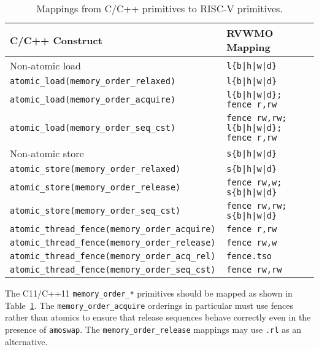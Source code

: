 \begin{table}[h!]
  \begin{tabular}{|l|l|}
    \hline
    C/C++ Construct                            & RVWMO Mapping \\
    \hline
    \hline
    Non-atomic load                            & \tt l\{b|h|w|d\}               \\
    \hline
    \tt atomic\_load(memory\_order\_relaxed)   & \tt l\{b|h|w|d\}               \\
    \hline
    \tt atomic\_load(memory\_order\_acquire)   & \tt l\{b|h|w|d\}; fence r,rw    \\
    \hline
    \tt atomic\_load(memory\_order\_seq\_cst)  & \tt fence rw,rw; l\{b|h|w|d\}; fence r,rw       \\
    \hline
    \hline
    Non-atomic store                           & \tt s\{b|h|w|d\}               \\
    \hline
    \tt atomic\_store(memory\_order\_relaxed)  & \tt s\{b|h|w|d\}               \\
    \hline
    \tt atomic\_store(memory\_order\_release)  & \tt fence rw,w; s\{b|h|w|d\}  \\
    \hline
    \tt atomic\_store(memory\_order\_seq\_cst) & \tt fence rw,rw; s\{b|h|w|d\} \\
    \hline
    \hline
    \tt atomic\_thread\_fence(memory\_order\_acquire)  & \tt fence r,rw \\
    \hline
    \tt atomic\_thread\_fence(memory\_order\_release)  & \tt fence rw,w \\
    \hline
    \tt atomic\_thread\_fence(memory\_order\_acq\_rel) & {\tt fence.tso} \\
    \hline
    \tt atomic\_thread\_fence(memory\_order\_seq\_cst) & \tt fence rw,rw \\
    \hline
  \end{tabular}
  \caption{Mappings from C/C++ primitives to RISC-V primitives.} %
  \label{tab:mappings}
\end{table}

The C11/C++11 {\tt memory\_order\_*} primitives should be mapped as shown in Table~\ref{tab:mappings}.
The {\tt memory\_order\_acquire} orderings in particular must use fences rather than atomics to ensure that release sequences behave correctly even in the presence of {\tt amoswap}.
The {\tt memory\_order\_release} mappings may use {\tt .rl} as an alternative.

